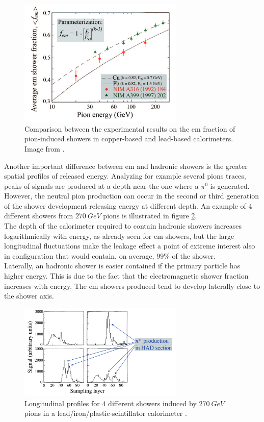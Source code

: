 \begin{figure}
	\centering
	\includegraphics[width=0.7\textwidth]{IMG/Cap2/f_em.png}
	\caption{Comparison between the experimental results on the em fraction of pion-induced showers in copper-based and lead-based calorimeters. Image from \cite{Wigmans_e_gamma}.}
	\label{fig:f_em}
\end{figure}

Another important difference between em and hadronic showers is the greater spatial profiles of released energy. Analyzing for example several pions traces, peaks of signals are produced at a depth near the one where a $\pi^0$ is generated. However, the neutral pion production can occur in the second or third generation of the shower development releasing energy at different depth. An example of $4$ different showers from $270\ GeV$ pions is illustrated in figure \ref{fig:had_start}.\\
The depth of the calorimeter required to contain hadronic showers increases logarithmically with energy, as already seen for em showers, but the large longitudinal fluctuations make the leakage effect a point of extreme interest also in configuration that would contain, on average, $99\%$ of the shower.\\
Laterally, an hadronic shower is easier contained if the primary particle has higher energy. This is due to the fact that the electromagnetic shower fraction increases with energy. The em showers produced tend to develop laterally close to the shower axis.
 
 \begin{figure}
	\centering
	\includegraphics[width=0.7\textwidth]{IMG/Cap2/had_start.png}
	\caption{Longitudinal  profiles  for  $4$  different  showers  induced  by  $270\ GeV$  pions  in  a  lead/iron/plastic-scintillator calorimeter \cite{Wigmans_e_gamma}.}
	\label{fig:had_start}
\end{figure}

